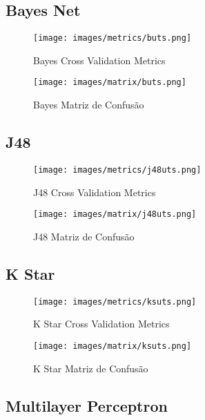\subsection{Bayes Net}

\begin{figure}[H]
  \centering
  \texttt{[image: images/metrics/buts.png]}
  \caption{Bayes Cross Validation Metrics}
  \label{fig:b_uts_metrics}
\end{figure}

\begin{figure}[H]
  \centering
  \texttt{[image: images/matrix/buts.png]}
  \caption{Bayes Matriz de Confusão}
  \label{fig:b_uts_matrix}
\end{figure}

\subsection{J48}

\begin{figure}[H]
  \centering
  \texttt{[image: images/metrics/j48uts.png]}
  \caption{J48 Cross Validation Metrics}
  \label{fig:j48_uts_metrics}
\end{figure}

\begin{figure}[H]
  \centering
  \texttt{[image: images/matrix/j48uts.png]}
  \caption{J48 Matriz de Confusão}
  \label{fig:j48_uts_matrix}
\end{figure}

\subsection{K Star}

\begin{figure}[H]
  \centering
  \texttt{[image: images/metrics/ksuts.png]}
  \caption{K Star Cross Validation Metrics}
  \label{fig:ks_uts_metrics}
\end{figure}

\begin{figure}[H]
  \centering
  \texttt{[image: images/matrix/ksuts.png]}
  \caption{K Star Matriz de Confusão}
  \label{fig:ks_uts_matrix}
\end{figure}


\subsection{Multilayer Perceptron}

